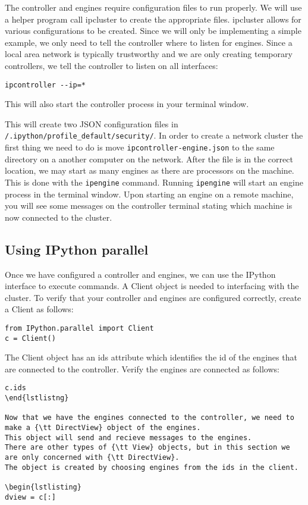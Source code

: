 The controller and engines require configuration files to run properly.
We will use a helper program call ipcluster to create the appropriate files.
ipcluster allows for various configurations to be created.
Since we will only be implementing a simple example, we only need to tell the controller where to listen for engines.
Since a local area network is typically trustworthy and we are only creating temporary controllers, we tell the controller to listen on all interfaces:

\begin{lstlisting}
ipcontroller --ip=*
\end{lstlisting}

This will also start the controller process in your terminal window.

This will create two JSON configuration files in {\tt /.ipython/profile_default/security/}.
In order to create a network cluster the first thing we need to do is move {\tt ipcontroller-engine.json} to the same directory on a another computer on the network.
After the file is in the correct location, we may start as many engines as there are processors on the machine.
This is done with the {\tt ipengine} command.
Running {\tt ipengine} will start an engine process in the terminal window.
Upon starting an engine on a remote machine, you will see some messages on the controller terminal stating which machine is now connected to the cluster.

\subsection{Using IPython parallel}

Once we have configured a controller and engines, we can use the IPython interface to execute commands.
A Client object is needed to interfacing with the cluster.
To verify that your controller and engines are configured correctly, create a Client as follows:

\begin{lstlisting}
from IPython.parallel import Client
c = Client()
\end{lstlisting}

The Client object has an ids attribute which identifies the id of the engines that are connected to the controller.
Verify the engines are connected as follows:

\begin{lstlisting}
c.ids
\end{lstlistng}

Now that we have the engines connected to the controller, we need to make a {\tt DirectView} object of the engines.
This object will send and recieve messages to the engines.
There are other types of {\tt View} objects, but in this section we are only concerned with {\tt DirectView}.
The object is created by choosing engines from the ids in the client.

\begin{lstlisting}
dview = c[:]
\end{lstlisting}


